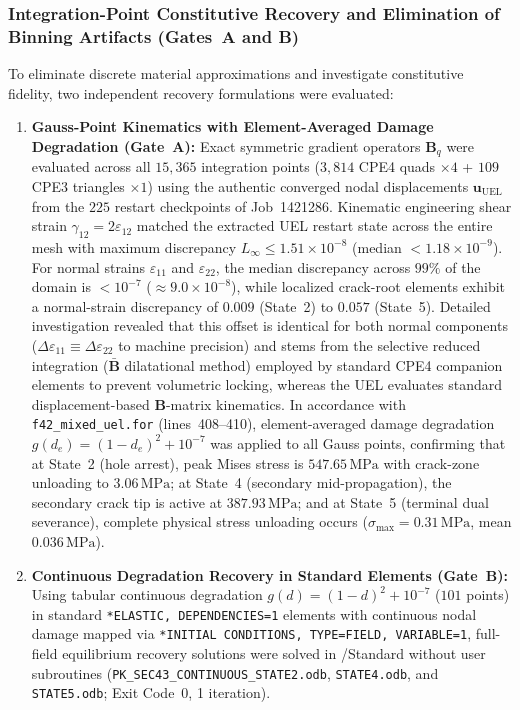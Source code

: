 \subsubsection{Integration-Point Constitutive Recovery and Elimination of Binning Artifacts (Gates~A and B)}
To eliminate discrete material approximations and investigate constitutive fidelity, two independent recovery formulations were evaluated:
\begin{enumerate}
  \item \textbf{Gauss-Point Kinematics with Element-Averaged Damage Degradation (Gate~A):} Exact symmetric gradient operators $\mathbf{B}_q$ were evaluated across all $15{,}365$ integration points ($3{,}814$ CPE4 quads $\times 4$ + $109$ CPE3 triangles $\times 1$) using the authentic converged nodal displacements $\mathbf{u}_{\mathrm{UEL}}$ from the $225$ restart checkpoints of Job~1421286. Kinematic engineering shear strain $\gamma_{12} = 2 \varepsilon_{12}$ matched the extracted UEL restart state across the entire mesh with maximum discrepancy $L_\infty \le 1.51 \times 10^{-8}$ (median $< 1.18 \times 10^{-9}$). For normal strains $\varepsilon_{11}$ and $\varepsilon_{22}$, the median discrepancy across $99\%$ of the domain is $< 10^{-7}$ ($\approx 9.0 \times 10^{-8}$), while localized crack-root elements exhibit a normal-strain discrepancy of $0.009$ (State~2) to $0.057$ (State~5). Detailed investigation revealed that this offset is identical for both normal components ($\Delta \varepsilon_{11} \equiv \Delta \varepsilon_{22}$ to machine precision) and stems from the selective reduced integration ($\bar{\mathbf{B}}$ dilatational method) employed by standard \Abaqus CPE4 companion elements to prevent volumetric locking, whereas the UEL evaluates standard displacement-based $\mathbf{B}$-matrix kinematics. In accordance with \texttt{f42\_mixed\_uel.for} (lines~408--410), element-averaged damage degradation $g(d_e) = (1 - d_e)^2 + 10^{-7}$ was applied to all Gauss points, confirming that at State~2 (hole arrest), peak Mises stress is $547.65\,\mathrm{MPa}$ with crack-zone unloading to $3.06\,\mathrm{MPa}$; at State~4 (secondary mid-propagation), the secondary crack tip is active at $387.93\,\mathrm{MPa}$; and at State~5 (terminal dual severance), complete physical stress unloading occurs ($\sigma_{\max} = 0.31\,\mathrm{MPa}$, mean $0.036\,\mathrm{MPa}$).
  \item \textbf{Continuous Degradation Recovery in Standard Elements (Gate~B):} Using tabular continuous degradation $g(d) = (1-d)^2 + 10^{-7}$ ($101$ points) in standard \texttt{*ELASTIC, DEPENDENCIES=1} elements with continuous nodal damage mapped via \texttt{*INITIAL CONDITIONS, TYPE=FIELD, VARIABLE=1}, full-field equilibrium recovery solutions were solved in \Abaqus/Standard without user subroutines (\texttt{PK\_SEC43\_CONTINUOUS\_STATE2.odb}, \texttt{STATE4.odb}, and \texttt{STATE5.odb}; Exit Code~0, 1 iteration).
\end{enumerate}

